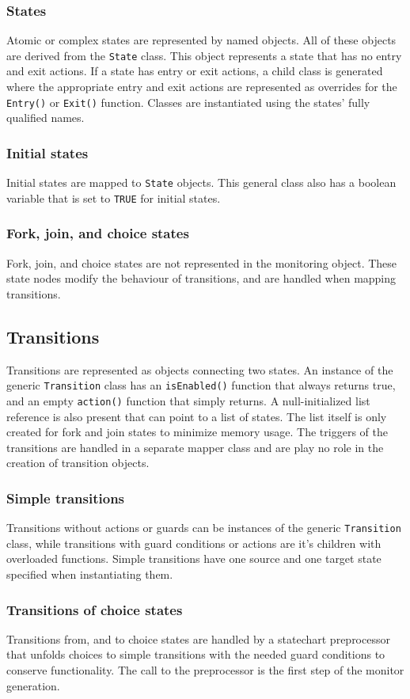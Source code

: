     \subsubsection{States}
Atomic or complex states are represented by named objects. All of these objects are derived from the \verb!State! class. This object represents a state that has no entry and exit actions. If a state has entry or exit actions, a child class is generated where the appropriate entry and exit actions are represented as overrides for the \verb!Entry()! or \verb!Exit()! function. Classes are instantiated using the states' fully qualified names.
    \subsubsection{Initial states}
Initial states are mapped to \verb!State! objects. This general class also has a boolean variable that is set to \verb!TRUE! for initial states.
    \subsubsection{Fork, join, and choice states}
Fork, join, and choice states are not represented in the monitoring object. These state nodes modify the behaviour of transitions, and are handled when mapping transitions.
  \subsection{Transitions}
Transitions are represented as objects connecting two states. An instance of the generic \verb!Transition! class has an \verb!isEnabled()! function that always returns true, and an empty \verb!action()! function that simply returns. A null-initialized list reference is also present that can point to a list of states. The list itself is only created for fork and join states to minimize memory usage. The triggers of the transitions are handled in a separate mapper class and are play no role in the creation of transition objects.
    \subsubsection{Simple transitions}
Transitions without actions or guards can be instances of the generic \verb!Transition! class, while transitions with guard conditions or actions are it's children with overloaded functions. Simple transitions have one source and one target state specified when instantiating them.
    \subsubsection{Transitions of choice states}
Transitions from, and to choice states are handled by a statechart preprocessor that unfolds choices to simple transitions with the needed guard conditions to conserve functionality. The call to the preprocessor is the first step of the monitor generation.
